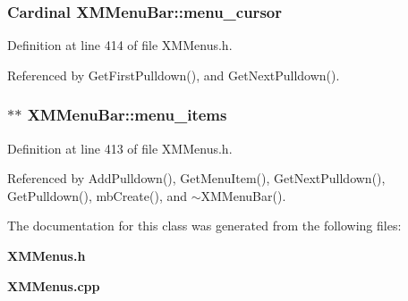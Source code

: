 \subsubsection{\setlength{\rightskip}{0pt plus 5cm}Cardinal XMMenu\-Bar::menu\_\-cursor\hspace{0.3cm}{\tt  [protected]}}\label{classXMMenuBar_n2}




Definition at line 414 of file XMMenus.h.

Referenced by Get\-First\-Pulldown(), and Get\-Next\-Pulldown().
\subsubsection{$\ast$$\ast$ XMMenu\-Bar::menu\_\-items\hspace{0.3cm}{\tt  [protected]}}\label{classXMMenuBar_n1}




Definition at line 413 of file XMMenus.h.

Referenced by Add\-Pulldown(), Get\-Menu\-Item(), Get\-Next\-Pulldown(), Get\-Pulldown(), mb\-Create(), and $\sim$XMMenu\-Bar().

The documentation for this class was generated from the following files:\begin{CompactItemize}
\item 
{\bf XMMenus.h}\item 
{\bf XMMenus.cpp}\end{CompactItemize}

